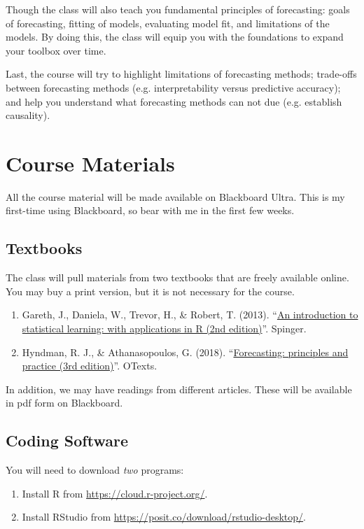 \documentclass[12pt]{article}
\begin{document}
Though the class will also teach you fundamental principles of forecasting: goals of forecasting, fitting of models, evaluating model fit, and limitations of the models. By doing this, the class will equip you with the foundations to expand your toolbox over time. 

Last, the course will try to highlight limitations of forecasting methods; trade-offs between forecasting methods (e.g. interpretability versus predictive accuracy); and help you understand what forecasting methods can not due (e.g. establish causality). 


\section*{Course Materials}

All the course material will be made available on Blackboard Ultra. This is my first-time using Blackboard, so bear with me in the first few weeks.

\subsection*{Textbooks}

The class will pull materials from two textbooks that are freely available online. You may buy a print version, but it is not necessary for the course. 

\begin{enumerate}
  \item Gareth, J., Daniela, W., Trevor, H., \& Robert, T. (2013). ``\href{https://www.statlearning.com}{An introduction to statistical learning: with applications in R (2nd edition)}''. Spinger.
  \item Hyndman, R. J., \& Athanasopoulos, G. (2018). ``\href{https://otexts.com/fpp3/}{Forecasting: principles and practice (3rd edition)}''. OTexts.
\end{enumerate}

In addition, we may have readings from different articles. These will be available in pdf form on Blackboard.



\subsection*{Coding Software}

You will need to download \emph{two} programs:
\begin{enumerate}
  \item Install R from \url{https://cloud.r-project.org/}.
  \item Install RStudio from \url{https://posit.co/download/rstudio-desktop/}. 
\end{enumerate}
\end{document}
